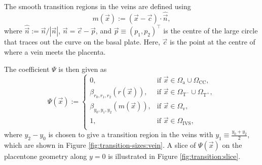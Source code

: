     The smooth transition regions in the veins are defined using
    \begin{equation*}
        m(\vec{x}) := (\vec{x} - \vec{c}) \cdot \hat{\vec{n}},
    \end{equation*}
    where $\hat{\vec{n}} := \vec{n}/|\vec{n}|$, $\vec{n} = \vec{c} - \vec{p}$, and $\vec{p} \equiv (p_1, p_2)^\intercal$ is the centre of the large circle that traces out the curve on the basal plate. Here, $\vec{c}$ is the point at the centre of where a vein meets the placenta.

    The coefficient $\Psi$ is then given as
    \begin{equation}
        \Psi(\vec{x}) := 
        \begin{cases}
            0, & \text{if } \vec{x} \in \Omega_\text{a} \cup \Omega_\text{CC}, \\
            \beta_{r_0,r_1,r_2}(r(\vec{x})), & \text{if } \vec{x} \in \Omega_{\text{T}^-} \cup \Omega_{\text{T}^+}, \\
            \beta_{y_0,y_1,y_2}(m(\vec{x})), & \text{if } \vec{x} \in \Omega_\text{v}, \\
            1, & \text{if } \vec{x} \in \Omega_\text{IVS}, \\
        \end{cases}
        \label{eq:smooth-transition}
    \end{equation}
    where $y_2 - y_0$ is chosen to give a transition region in the veins with $y_1 \equiv \frac{y_0 + y_2}{2}$, which are shown in Figure \ref{fig:transition-sizes:vein}. A slice of $\Psi(\vec{x})$ on the placentone geometry along $y = 0$ is illustrated in Figure \ref{fig:transition:slice}.
    